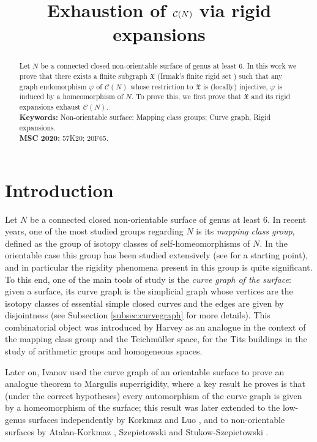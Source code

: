 \documentclass{artv3}
\title{Exhaustion of $\cg{N}$ via rigid expansions}
\date{}
\newcommand*{\cg}[1]{\mathcal{C}(#1)}
\newcommand*{\X}{\mathfrak{X}}
\begin{document}
\maketitle
\begin{abstract}
 Let $N$ be a connected closed non-orientable surface of genus at least 6. In this work we prove that there exists a finite subgraph $\X$ (Irmak's finite rigid set \cite{Irmak2019}) such that any graph endomorphism $\varphi$ of $\cg{N}$ whose restriction to $\X$ is (locally) injective, $\varphi$ is induced by a homeomorphism of $N$. To prove this, we first prove that $\X$ and its rigid expansions exhaust $\cg{N}$.\\[0.5cm]
 \textbf{Keywords:} Non-orientable surface; Mapping class groups; Curve graph, Rigid expansions.\\[0.5cm]
 \textbf{MSC 2020:} 57K20; 20F65.
\end{abstract}
\section*{Introduction}

Let $N$ be a connected closed non-orientable surface of genus at least 6. In recent years, one of the most studied groups regarding $N$ is its \emph{mapping class group}, defined as the group of isotopy classes of self-homeomorphisms of $N$. In the orientable case this group has been studied extensively (see \cite{FarbMargalit} for a starting point), and in particular the rigidity phenomena present in this group is quite significant. To this end, one of the main tools of study is the \emph{curve graph of the surface}: given a surface, its curve graph is the simplicial graph whose vertices are the isotopy classes of essential simple closed curves and the edges are given by disjointness (see Subsection \ref{subsec:curvegraph} for more details). This combinatorial object was introduced by Harvey \cite{Harvey81} as an analogue in the context of the mapping class group and the Teichmüller space, for the Tits buildings in the study of arithmetic groups and homogeneous spaces.

Later on, Ivanov \cite{Ivanov} used the curve graph of an orientable surface to prove an analogue theorem to Margulis superrigidity, where a key result he proves is that (under the correct hypotheses) every automorphism of the curve graph is given by a homeomorphism of the surface; this result was later extended to the low-genus surfaces independently by Korkmaz \cite{Korkmaz} and Luo \cite{Luo}, and to non-orientable surfaces by Atalan-Korkmaz \cite{Atalan-Korkmaz}, Szepietowski \cite{Szepietowski20} and Stukow-Szepietowski \cite{SS25}.
\end{document}
